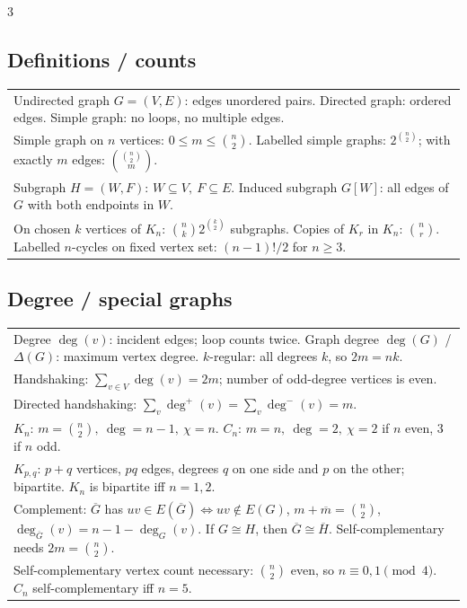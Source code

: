 \documentclass[10pt]{article}
\begin{document}
\begin{multicols*}{3}
\subsection*{Definitions / counts}
\begin{tabular}{@{}p{}@{}}
Undirected graph \(G=(V,E)\): edges unordered pairs. Directed graph: ordered edges. Simple graph: no loops, no multiple edges.\\
Simple graph on \(n\) vertices: \(0\le m\le\binom n2\). Labelled simple graphs: \(2^{\binom n2}\); with exactly \(m\) edges: \(\binom{\binom n2}{m}\).\\
Subgraph \(H=(W,F)\): \(W\subseteq V,\ F\subseteq E\). Induced subgraph \(G[W]\): all edges of \(G\) with both endpoints in \(W\).\\
On chosen \(k\) vertices of \(K_n\): \(\binom nk2^{\binom k2}\) subgraphs. Copies of \(K_r\) in \(K_n\): \(\binom nr\). Labelled \(n\)-cycles on fixed vertex set: \((n-1)!/2\) for \(n\ge3\).\\
\end{tabular}

\subsection*{Degree / special graphs}
\begin{tabular}{@{}p{}@{}}
Degree \(\deg(v)\): incident edges; loop counts twice. Graph degree \(\deg(G)\) / \(\Delta(G)\): maximum vertex degree. \(k\)-regular: all degrees \(k\), so \(2m=nk\).\\
Handshaking: \(\sum_{v\in V}\deg(v)=2m\); number of odd-degree vertices is even.\\
Directed handshaking: \(\sum_v\deg^+(v)=\sum_v\deg^-(v)=m\).\\
\(K_n\): \(m=\binom n2,\ \deg=n-1,\ \chi=n\). \(C_n\): \(m=n,\ \deg=2,\ \chi=2\) if \(n\) even, \(3\) if \(n\) odd.\\
\(K_{p,q}\): \(p+q\) vertices, \(pq\) edges, degrees \(q\) on one side and \(p\) on the other; bipartite. \(K_n\) is bipartite iff \(n=1,2\).\\
Complement: \(\overline G\) has \(uv\in E(\overline G)\iff uv\notin E(G)\), \(m+\overline m=\binom n2\), \(\deg_{\overline G}(v)=n-1-\deg_G(v)\). If \(G\cong H\), then \(\overline G\cong\overline H\). Self-complementary needs \(2m=\binom n2\).\\
Self-complementary vertex count necessary: \(\binom n2\) even, so \(n\equiv0,1\pmod4\). \(C_n\) self-complementary iff \(n=5\).\\
\end{tabular}


\end{multicols*}
\end{document}
